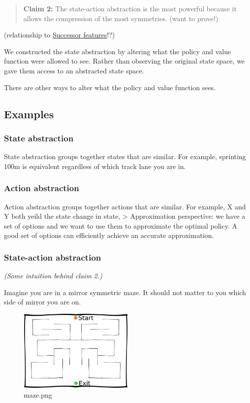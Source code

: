 \begin{quote}
\textbf{Claim 2:} The state-action abstraction is the most powerful
because it allows the compression of the most symmetries. (want to
prove!)
\end{quote}

(relationship to
\href{http://www.gatsby.ucl.ac.uk/~dayan/papers/d93b.pdf}{Successor
features}!?)

We constructed the state abstraction by altering what the policy and
value function were allowed to see. Rather than observing the original
state space, we gave them access to an abstracted state space.

There are other ways to alter what the policy and value function sees.

\subsection{Examples}

\subsubsection{State abstraction}

State abstraction groups together states that are similar. For example,
sprinting 100m is equivalent regardless of which track lane you are in.

\subsubsection{Action abstraction}

Action abstraction groups together actions that are similar. For
example, X and Y both yeild the state change in state, \textgreater{}
Approximation perspective: we have a set of options and we want to use
them to approximate the optimal policy. A good set of options can
efficiently achieve an accurate approximation.

\subsubsection{State-action abstraction}

\emph{(Some intuition behind claim 2.)}

Imagine you are in a mirror symmetric maze. It should not matter to you
which side of mirror you are on.

\begin{figure}
\centering
\includegraphics[width=0.5\textwidth,height=0.5\textheight]{../../pictures/drawings/maze.png}
\caption{maze.png}
\end{figure}

